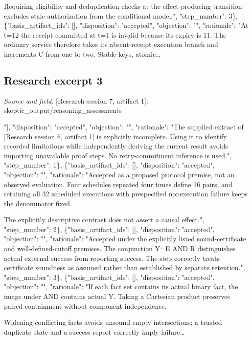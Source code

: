 \documentclass[11pt]{article}
\begin{document}
Requiring eligibility and deduplication checks at the effect-producing transition excludes stale authorization from the conditional model.", "step\_number": 3\}, \{"basis\_artifact\_ids": [], "disposition": "accepted", "objection": "", "rationale": "At t=12 the receipt committed at t=1 is invalid because its expiry is 11. The ordinary service therefore takes its absent-receipt execution branch and increments C from one to two. Stable keys, atomic\ldots{}

\subsection{Research excerpt 3}
\textit{Source and field: }[Research session 7, artifact 1]: skeptic\_output/reasoning\_assessments\par
[\{"basis\_artifact\_ids": ["[Research session 6, artifact 1]"], "disposition": "accepted", "objection": "", "rationale": "The supplied extract of [Research session 6, artifact 1] is explicitly incomplete. Using it to identify recorded limitations while independently deriving the current result avoids importing unavailable proof steps. No retry-commitment inference is used.", "step\_number": 1\}, \{"basis\_artifact\_ids": [], "disposition": "accepted", "objection": "", "rationale": "Accepted as a proposed protocol premise, not an observed evaluation. Four schedules repeated four times define 16 pairs, and retaining all 32 scheduled executions with prespecified nonexecution failure keeps the denominator fixed.

The explicitly descriptive contrast does not assert a causal effect.", "step\_number": 2\}, \{"basis\_artifact\_ids": [], "disposition": "accepted", "objection": "", "rationale": "Accepted under the explicitly listed sound-certificate and well-defined-cutoff premises. The conjunction Y=E AND R distinguishes actual external success from reporting success. The step correctly treats certificate soundness as assumed rather than established by separate retention.", "step\_number": 3\}, \{"basis\_artifact\_ids": [], "disposition": "accepted", "objection": "", "rationale": "If each fact set contains its actual binary fact, the image under AND contains actual Y. Taking a Cartesian product preserves paired containment without component independence.

Widening conflicting facts avoids unsound empty intersections; a trusted duplicate state and a success report correctly imply failure\ldots{}
\end{document}
